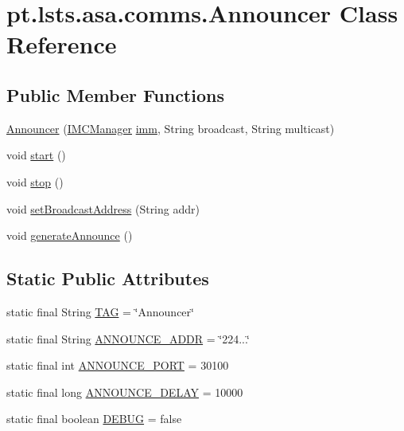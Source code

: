 \hypertarget{classpt_1_1lsts_1_1asa_1_1comms_1_1Announcer}{}\section{pt.\+lsts.\+asa.\+comms.\+Announcer Class Reference}
\label{classpt_1_1lsts_1_1asa_1_1comms_1_1Announcer}
\subsection*{Public Member Functions}
\begin{DoxyCompactItemize}
\item 
\hyperlink{classpt_1_1lsts_1_1asa_1_1comms_1_1Announcer_a485a1d4071edc469e9a991bb0378007c}{Announcer} (\hyperlink{classpt_1_1lsts_1_1asa_1_1managers_1_1IMCManager}{I\+M\+C\+Manager} \hyperlink{classpt_1_1lsts_1_1asa_1_1comms_1_1Announcer_a899369bb5523890384993f85eea10fdd}{imm}, String broadcast, String multicast)
\item 
void \hyperlink{classpt_1_1lsts_1_1asa_1_1comms_1_1Announcer_a485992536f87e50b74cb0620cca60d7c}{start} ()
\item 
void \hyperlink{classpt_1_1lsts_1_1asa_1_1comms_1_1Announcer_add4dd0f5d7e5b2ebf4c8f2415d87e60c}{stop} ()
\item 
void \hyperlink{classpt_1_1lsts_1_1asa_1_1comms_1_1Announcer_ae9e999b0bb75955049b2824613c296bc}{set\+Broadcast\+Address} (String addr)
\item 
void \hyperlink{classpt_1_1lsts_1_1asa_1_1comms_1_1Announcer_aac16139f8922ddf5faa9bdcf6b52922a}{generate\+Announce} ()
\end{DoxyCompactItemize}
\subsection*{Static Public Attributes}
\begin{DoxyCompactItemize}
\item 
static final String \hyperlink{classpt_1_1lsts_1_1asa_1_1comms_1_1Announcer_a126257643f3cf4a5ecfe2d7982c6450a}{T\+A\+G} = \char`\"{}Announcer\char`\"{}
\item 
static final String \hyperlink{classpt_1_1lsts_1_1asa_1_1comms_1_1Announcer_a991339b7b53ed8b0948d2421bcb05ff4}{A\+N\+N\+O\+U\+N\+C\+E\+\_\+\+A\+D\+D\+R} = \char`\"{}224...\char`\"{}
\item 
static final int \hyperlink{classpt_1_1lsts_1_1asa_1_1comms_1_1Announcer_a8f1d0dde03c935646275bb0ca3d247da}{A\+N\+N\+O\+U\+N\+C\+E\+\_\+\+P\+O\+R\+T} = 30100
\item 
static final long \hyperlink{classpt_1_1lsts_1_1asa_1_1comms_1_1Announcer_a11efc9cfd8265c7710b2c42698977ae7}{A\+N\+N\+O\+U\+N\+C\+E\+\_\+\+D\+E\+L\+A\+Y} = 10000
\item 
static final boolean \hyperlink{classpt_1_1lsts_1_1asa_1_1comms_1_1Announcer_a708b0e5d2f0d2e716f55597dbbc8f5d4}{D\+E\+B\+U\+G} = false
\end{DoxyCompactItemize}
